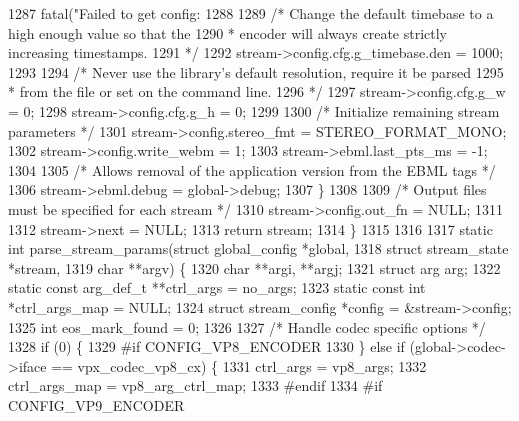 \begin{DoxyCodeInclude}
{{{{{{{{{{{{{{{{{{{{{{{{{{{{{{{{{1287       fatal(\textcolor{stringliteral}{"Failed to get config: %
1288 
1289     \textcolor{comment}{/* Change the default timebase to a high enough value so that the}
1290 \textcolor{comment}{     * encoder will always create strictly increasing timestamps.}
1291 \textcolor{comment}{     */}
1292     stream->config.cfg.g\_timebase.den = 1000;
1293 
1294     \textcolor{comment}{/* Never use the library's default resolution, require it be parsed}
1295 \textcolor{comment}{     * from the file or set on the command line.}
1296 \textcolor{comment}{     */}
1297     stream->config.cfg.g\_w = 0;
1298     stream->config.cfg.g\_h = 0;
1299 
1300     \textcolor{comment}{/* Initialize remaining stream parameters */}
1301     stream->config.stereo\_fmt = STEREO\_FORMAT\_MONO;
1302     stream->config.write\_webm = 1;
1303     stream->ebml.last\_pts\_ms = -1;
1304 
1305     \textcolor{comment}{/* Allows removal of the application version from the EBML tags */}
1306     stream->ebml.debug = global->debug;
1307   \}
1308 
1309   \textcolor{comment}{/* Output files must be specified for each stream */}
1310   stream->config.out\_fn = NULL;
1311 
1312   stream->next = NULL;
1313   \textcolor{keywordflow}{return} stream;
1314 \}
1315 
1316 
1317 \textcolor{keyword}{static} \textcolor{keywordtype}{int} parse\_stream\_params(\textcolor{keyword}{struct} global\_config *global,
1318                                \textcolor{keyword}{struct} stream\_state  *stream,
1319                                \textcolor{keywordtype}{char} **argv) \{
1320   \textcolor{keywordtype}{char}                   **argi, **argj;
1321   \textcolor{keyword}{struct }arg               arg;
1322   \textcolor{keyword}{static} \textcolor{keyword}{const} arg\_def\_t **ctrl\_args = no\_args;
1323   \textcolor{keyword}{static} \textcolor{keyword}{const} \textcolor{keywordtype}{int}        *ctrl\_args\_map = NULL;
1324   \textcolor{keyword}{struct }stream\_config    *config = &stream->config;
1325   \textcolor{keywordtype}{int}                      eos\_mark\_found = 0;
1326 
1327   \textcolor{comment}{/* Handle codec specific options */}
1328   \textcolor{keywordflow}{if} (0) \{
1329 \textcolor{preprocessor}{#if CONFIG\_VP8\_ENCODER}
1330   \} \textcolor{keywordflow}{else} \textcolor{keywordflow}{if} (global->codec->iface == vpx\_codec\_vp8\_cx) \{
1331     ctrl\_args = vp8\_args;
1332     ctrl\_args\_map = vp8\_arg\_ctrl\_map;
1333 \textcolor{preprocessor}{#endif}
1334 \textcolor{preprocessor}{#if CONFIG\_VP9\_ENCODER}
}}}}}}}}}}}}}}}}}}}}}}}}}}}}}}}}}}
\end{DoxyCodeInclude}
